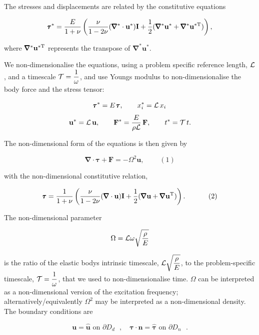 The stresses and displacements are related by the constitutive equations \begin{center} \[ \pmb{\tau}^*=\frac{E}{1+\nu}\left( \frac{\nu}{1-2\nu}(\pmb{\nabla}^*\cdot\mathbf{u}^*)\textbf{I}+ \frac{1}{2}(\pmb{\nabla}^*\mathbf{u}^*+\pmb{\nabla}^*\mathbf{u}^{*{\rm T}})\right), \] \end{center}  where $ \pmb{\nabla}^*\mathbf{u}^{*{\rm T}} $ represents the transpose of $ \pmb{\nabla}^*\mathbf{u}^* $.

We non-\/dimensionalise the equations, using a problem specific reference length, $ {\cal L} $, and a timescale $ \displaystyle {\cal T}=\frac{1}{\omega} $, and use Young\textquotesingle{}s modulus to non-\/dimensionalise the body force and the stress tensor\+: \begin{center} \[ \pmb{\tau}^* = E \, \pmb{\tau}, \qquad x_{i}^* = {\cal L}\, x_{i} \] \[ \mathbf{u}^* = {\cal L}\, \mathbf{u}, \qquad \mathbf{F}^* = \frac{E}{\rho \cal L} \, \mathbf{F}, \qquad t^* = {\cal T}\, t. \] \end{center} 

The non-\/dimensional form of the equations is then given by \begin{center} \[ \pmb{\nabla}\cdot\pmb{\tau}+\mathbf{F}=-\Omega^2\mathbf{u}, \ \ \ \ \ \ \ \ \ \ (1) \] \end{center}  with the non-\/dimensional constitutive relation, \begin{center} \[ \pmb{\tau}=\frac{1}{1+\nu}\left( \frac{\nu}{1-2\nu}(\pmb{\nabla}\cdot\mathbf{u})\textbf{I}+ \frac{1}{2}(\pmb{\nabla}\mathbf{u}+\pmb{\nabla}\mathbf{u}^{{\rm T}})\right). \ \ \ \ \ \ \ \ \ \ (2) \] \end{center}  The non-\/dimensional parameter \begin{center} \[ \Omega = {\cal L}\omega \sqrt{\frac{\rho}{E}} \] \end{center}  is the ratio of the elastic body\textquotesingle{}s intrinsic timescale, $\displaystyle {\cal L} \sqrt{\frac{\rho}{E}}$, to the problem-\/specific timescale, $ \displaystyle {\cal T}=\frac{1}{\omega} $, that we used to non-\/dimensionalise time. $ \Omega $ can be interpreted as a non-\/dimensional version of the excitation frequency; alternatively/equivalently $ \Omega^2 $ may be interpreted as a non-\/dimensional density. The boundary conditions are \begin{center} \[ \mathbf{u}=\mathbf{\hat{u}}\,\,\textrm{on $\partial D_d $ },\quad \pmb{\tau} \cdot {\mathbf{n}}=\pmb{\hat{\tau}}\,\,\textrm{on $\partial D_n $ }. \] \end{center} 



